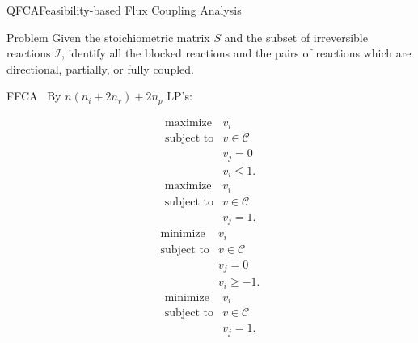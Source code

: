 \documentclass[10pt]{beamer}
\theoremstyle{remark}
\theoremstyle{definition}
\begin{document}
\begin{frame}{QFCA}{Feasibility-based Flux Coupling Analysis}

  \begin{block}{Problem}
  Given the stoichiometric matrix $S$ and the subset of irreversible reactions $\mathcal{I}$, 
  identify all the blocked reactions and the pairs of reactions which are directional, 
  partially, or fully coupled.
  \end{block}\pause
  
  \begin{block}{FFCA~\cite{david2011ffca}}
  By $n(n_i+2n_r)+2n_p$ LP's:
  \vspace{-20pt}
  \begin{multicols}{2}
  \[
  \begin{array}{ll}
  \mbox{maximize}	& v_i \\
  \mbox{subject to}	& v \in \mathcal{C}\\
		  			& v_j = 0\\
	  				& v_i \leq 1.
  \end{array}
  \]
  \[
	\begin{array}{ll}
	\mbox{maximize}		& v_i \\
	\mbox{subject to}	& v \in \mathcal{C}\\
						& v_j = 1.
	\end{array}
  \] 
  \break
  \vspace{-11pt}
  \[
  \begin{array}{ll}
  \mbox{minimize}	& v_i \\
  \mbox{subject to}	& v \in \mathcal{C}\\
		  			& v_j = 0\\
	  				& v_i \geq -1.
  \end{array}
  \]
  \[
	\begin{array}{ll}
	\mbox{minimize}		& v_i \\
	\mbox{subject to}	& v \in \mathcal{C}\\
						& v_j = 1.
	\end{array}
  \]

  \end{multicols}
  \end{block}
\end{frame}

\end{document}

